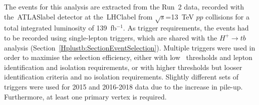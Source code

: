The events for this analysis are extracted from the Run~2 data, recorded with the~\acrshort{ATLASlabel} detector at the~\acrshort{LHClabel} from $\sqrt{s}$=13~TeV $pp$ collisions for a total integrated luminosity of 139~fb$^{-1}$. As trigger requirements, the events had to be recorded using single-lepton triggers, which are shared with the $H^+\to tb$ analysis (Section~\ref{Hplustb:SectionEventSelection}).
Multiple triggers were used in order to maximise the selection efficiency, either with low \pT\ thresholds and lepton identification and isolation requirements, or with higher thresholds but looser identification criteria and no isolation requirements. Slightly different sets of triggers were used for 2015 and 2016-2018 data due to the increase in pile-up. Furthermore, at least one primary vertex is required. %


